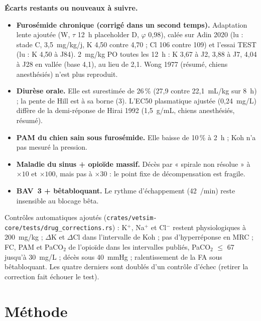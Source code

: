 \documentclass[10pt,a4paper]{article}
\newcommand{\cmd}[1]{\texttt{#1}}
\begin{document}
\textbf{Écarts restants ou nouveaux à suivre.}
\begin{itemize}
\item \textbf{Furosémide chronique (corrigé dans un second temps).} Adaptation lente ajoutée (W, $\tau$ 12~h placeholder D, $\varphi$ 0,98), calée sur Adin 2020 (lu : stade C, 3,5~mg/kg/j, K 4,50 contre 4,70 ; Cl 106 contre 109) et l'essai TEST (lu : K 4,50 à J84). 2~mg/kg PO toutes les 12~h : K 3,67 à J2, 3,88 à J7, 4,04 à J28 en vallée (base 4,1), au lieu de 2,1. Wong 1977 (résumé, chiens anesthésiés) n'est plus reproduit.
\item \textbf{Diurèse orale.} Elle est surestimée de 26\,\% (27,9 contre 22,1~mL/kg sur 8~h) ; la pente de Hill est à sa borne (3). L'EC50 plasmatique ajustée (0,24~mg/L) diffère de la demi-réponse de Hirai 1992 (1,5~\textmu g/mL, chiens anesthésiés, résumé).
\item \textbf{PAM du chien sain sous furosémide.} Elle baisse de 10\,\% à 2~h ; Koh n'a pas mesuré la pression.
\item \textbf{Maladie du sinus + opioïde massif.} Décès par « spirale non résolue » à $\times 10$ et $\times 100$, mais pas à $\times 30$ : le point fixe de décompensation est fragile.
\item \textbf{BAV~3 + bêtabloquant.} Le rythme d'échappement (42~/min) reste insensible au blocage bêta.
\end{itemize}

Contrôles automatiques ajoutés (\cmd{crates/vetsim-core/tests/drug\_corrections.rs}) : K$^+$, Na$^+$ et Cl$^-$ restent physiologiques à 200~mg/kg ; $\Delta$K et $\Delta$Cl dans l'intervalle de Koh ; pas d'hyperréponse en MRC ; FC, PAM et PaCO$_2$ de l'opioïde dans les intervalles publiés, PaCO$_2$ $\leq$ 67 jusqu'à 30~mg/L ; décès sous 40~mmHg ; ralentissement de la FA sous bêtabloquant. Les quatre derniers sont doublés d'un contrôle d'échec (retirer la correction fait échouer le test).

\section{Méthode}
\end{document}
